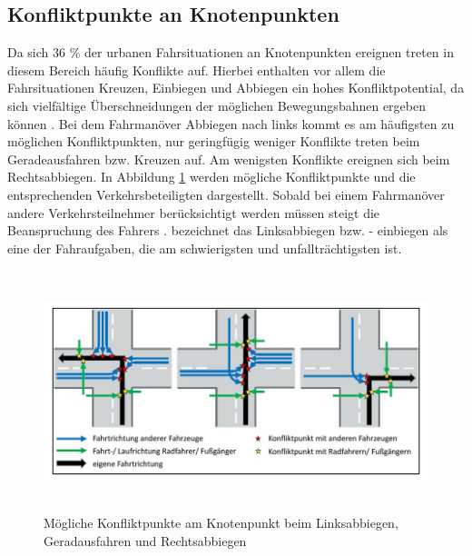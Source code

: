 \subsection{Konfliktpunkte an Knotenpunkten}\label{subsection:Konfliktpunkte an Knotenpunkten}
Da sich 36 \% der urbanen Fahrsituationen an Knotenpunkten ereignen \parencite[S. 40]{Gerstenberger.17.02.2015} treten in diesem Bereich häufig Konflikte auf. Hierbei enthalten vor allem die Fahrsituationen Kreuzen, Einbiegen und Abbiegen ein hohes Konfliktpotential, da sich vielfältige Überschneidungen der möglichen Bewegungsbahnen ergeben können \parencite[S. 83]{Reichart.2001}. Bei dem Fahrmanöver Abbiegen nach links kommt es am häufigsten zu möglichen Konfliktpunkten, nur geringfügig weniger Konflikte treten beim Geradeausfahren bzw. Kreuzen auf. Am wenigsten Konflikte ereignen sich beim Rechtsabbiegen. In Abbildung \ref{fig:Konfliktpunke am Knotenpunkt} werden mögliche Konfliktpunkte und die entsprechenden Verkehrsbeteiligten dargestellt. Sobald bei einem Fahrmanöver andere Verkehrsteilnehmer berücksichtigt werden müssen steigt die Beanspruchung des Fahrers \parencite[S. 9]{Mages.2008}. \Textcite[S. 84]{Reichart.2001} bezeichnet das Linksabbiegen bzw. - einbiegen als eine der Fahraufgaben, die am schwierigsten und unfallträchtigsten ist.

\begin{savenotes}
	\begin{figure}[H]
		\centering
		\includegraphics[width=15cm,height=7cm]{figures/Konfliktpunkte}
		\caption[Mögliche Konfliktpunkte am Knotenpunkt beim Linksabbiegen, Geradausfahren und Rechtsabbiegen]{Mögliche Konfliktpunkte am Knotenpunkt beim Linksabbiegen, Geradausfahren und Rechtsabbiegen \parencite[S. 41]{Gerstenberger.17.02.2015}}\label{fig:Konfliktpunke am Knotenpunkt}
	\end{figure}
\end{savenotes}

